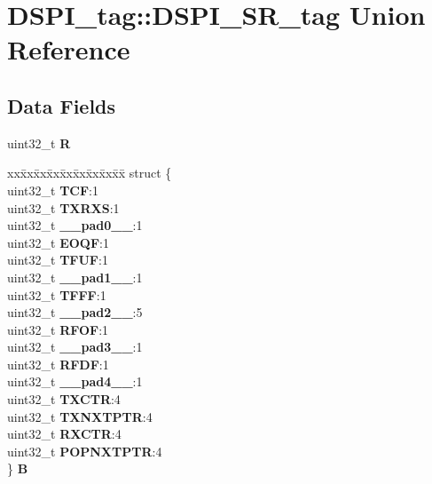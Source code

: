 \hypertarget{unionDSPI__tag_1_1DSPI__SR__tag}{}\section{D\+S\+P\+I\+\_\+tag\+::D\+S\+P\+I\+\_\+\+S\+R\+\_\+tag Union Reference}
\label{unionDSPI__tag_1_1DSPI__SR__tag}
\subsection*{Data Fields}
\begin{DoxyCompactItemize}
\item 
\mbox{\label{unionDSPI__tag_1_1DSPI__SR__tag_ac34be499ac6dfe2134da55900a804383}} 
uint32\+\_\+t {\bfseries R}
\item 
\mbox{\label{unionDSPI__tag_1_1DSPI__SR__tag_a6368b28bc2a1637b4a1a063f2f4225e5}} 
\begin{tabbing}
xx\=xx\=xx\=xx\=xx\=xx\=xx\=xx\=xx\=\kill
struct \{\\
\>uint32\_t {\bfseries TCF}:1\\
\>uint32\_t {\bfseries TXRXS}:1\\
\>uint32\_t {\bfseries \_\_pad0\_\_}:1\\
\>uint32\_t {\bfseries EOQF}:1\\
\>uint32\_t {\bfseries TFUF}:1\\
\>uint32\_t {\bfseries \_\_pad1\_\_}:1\\
\>uint32\_t {\bfseries TFFF}:1\\
\>uint32\_t {\bfseries \_\_pad2\_\_}:5\\
\>uint32\_t {\bfseries RFOF}:1\\
\>uint32\_t {\bfseries \_\_pad3\_\_}:1\\
\>uint32\_t {\bfseries RFDF}:1\\
\>uint32\_t {\bfseries \_\_pad4\_\_}:1\\
\>uint32\_t {\bfseries TXCTR}:4\\
\>uint32\_t {\bfseries TXNXTPTR}:4\\
\>uint32\_t {\bfseries RXCTR}:4\\
\>uint32\_t {\bfseries POPNXTPTR}:4\\
\} {\bfseries B}\\


\end{tabbing}
\end{DoxyCompactItemize}
